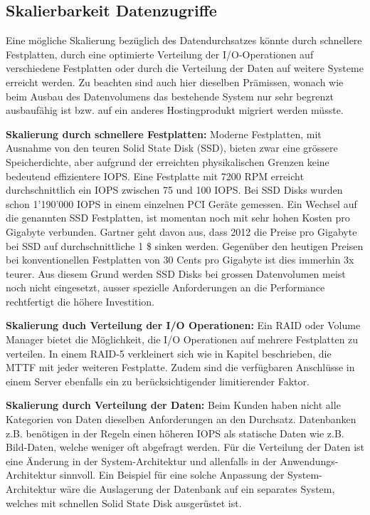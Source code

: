 \subsection{Skalierbarkeit Datenzugriffe}
Eine mögliche Skalierung bezüglich des Datendurchsatzes könnte durch schnellere Festplatten, durch eine optimierte Verteilung der I/O-Operationen auf verschiedene Festplatten oder durch die Verteilung der Daten auf weitere Systeme erreicht werden. Zu beachten sind auch hier dieselben Prämissen, wonach wie beim Ausbau des Datenvolumens das bestehende System nur sehr begrenzt ausbaufähig ist bzw. auf ein anderes Hostingprodukt migriert werden müsste.

\textbf{Skalierung durch schnellere Festplatten:}
Moderne Festplatten, mit Ausnahme von den teuren Solid State Disk (SSD), bieten zwar eine grössere Speicherdichte, aber aufgrund der erreichten physikalischen Grenzen keine bedeutend effizientere IOPS. Eine Festplatte mit 7200 RPM erreicht durchschnittlich ein IOPS zwischen 75 und 100 IOPS. Bei SSD Disks wurden schon 1'190'000 IOPS in einem einzelnen PCI Geräte gemessen. \cite{Symantec2011} \cite{Fusionio} 
Ein Wechsel auf die genannten SSD Festplatten, ist momentan noch mit sehr hohen Kosten pro Gigabyte verbunden. Gartner geht davon aus, dass 2012 die Preise pro Gigabyte bei SSD auf durchschnittliche 1 \$ sinken werden. Gegenüber den heutigen Preisen bei konventionellen Festplatten von 30 Cents pro Gigabyte ist dies immerhin 3x teurer. Aus diesem Grund werden SSD Disks bei grossen Datenvolumen meist noch nicht eingesetzt, ausser spezielle Anforderungen an die Performance rechtfertigt die höhere Investition. \cite{AgamShah2011}

\textbf{Skalierung duch Verteilung der I/O Operationen:}
Ein RAID oder Volume Manager bietet die Möglichkeit, die I/O Operationen auf mehrere Festplatten zu verteilen. In einem RAID-5 verkleinert sich wie in Kapitel  beschrieben, die MTTF mit jeder weiteren Festplatte. Zudem sind die verfügbaren Anschlüsse in einem Server ebenfalls ein zu berücksichtigender limitierender Faktor.

\textbf{Skalierung durch Verteilung der Daten:}
Beim Kunden haben nicht alle Kategorien von Daten dieselben Anforderungen an den Durchsatz. Datenbanken z.B. benötigen in der Regeln einen höheren IOPS als statische Daten wie z.B. Bild-Daten, welche weniger oft abgefragt werden. Für die Verteilung der Daten ist eine Änderung in der System-Architektur und allenfalls in der Anwendungs-Architektur sinnvoll. Ein Beispiel für eine solche Anpassung der System-Architektur wäre die Auslagerung der Datenbank auf ein separates System, welches mit schnellen Solid State Disk ausgerüstet ist. 

